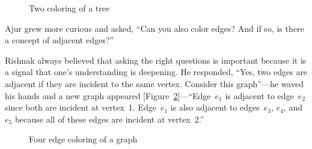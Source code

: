 \begin{figure}
\begin{center}


\caption{Two coloring of a tree}\label{10g4}
\end{center}
\end{figure}

Ajur grew more curious and asked, ``Can you also color edges? And if so, is there a concept of adjacent edges?''

Rishnak always believed that asking the right questions is important because it is a signal that one's understanding is deepening. He responded, ``Yes, two edges are adjacent if they are incident to the same vertex. Consider this graph''---he waved his hands and a new graph appeared [Figure~\ref{10g5}]---``Edge~$e_1$ is adjacent to edge~$e_2$ since both are incident at vertex~1. Edge~$e_1$ is also adjacent to edges~$e_3$, $e_4$, and~$e_5$ because all of these edges are incident at vertex~2.''

\begin{figure}
\begin{center}


\caption{Four edge coloring of a graph}\label{10g5}
\end{center}
\end{figure}

